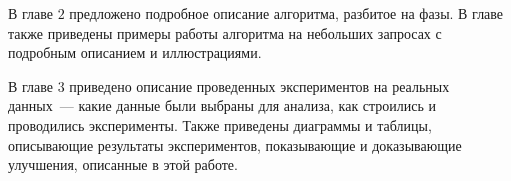 В главе $2$ предложено подробное описание алгоритма, разбитое на фазы. В главе также приведены примеры работы алгоритма на небольших запросах с подробным описанием и иллюстрациями.

В главе $3$ приведено описание проведенных экспериментов на реальных данных~--- какие данные были выбраны для анализа, как строились и проводились эксперименты. Также приведены диаграммы и таблицы, описывающие результаты экспериментов, показывающие и доказывающие улучшения, описанные в этой работе.
